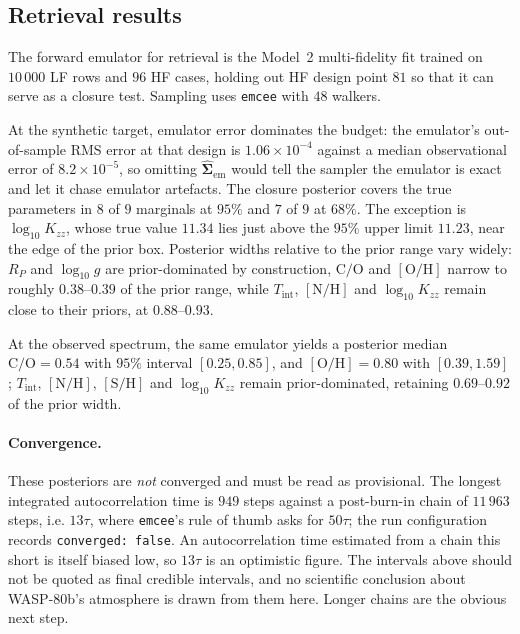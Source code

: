 \documentclass[12pt, letterpaper, oneside]{article}
\begin{document}
\subsection{Retrieval results}
\label{sec:retrieval-results}

The forward emulator for retrieval is the Model~2 multi-fidelity fit trained
on $10\,000$ LF rows and $96$ HF cases, holding out HF design point $81$ so
that it can serve as a closure test. Sampling uses \texttt{emcee} with $48$
walkers.

At the synthetic target, emulator error dominates the budget: the emulator's
out-of-sample RMS error at that design is $1.06\times10^{-4}$ against a median
observational error of $8.2\times10^{-5}$, so omitting
$\widehat{\bm\Sigma}_{\mathrm{em}}$ would tell the sampler the emulator is
exact and let it chase emulator artefacts. The closure posterior covers the
true parameters in $8$ of $9$ marginals at $95\%$ and $7$ of $9$ at $68\%$.
The exception is $\log_{10}K_{zz}$, whose true value $11.34$ lies just above
the $95\%$ upper limit $11.23$, near the edge of the prior box. Posterior
widths relative to the prior range vary widely: $R_P$ and $\log_{10}g$ are
prior-dominated by construction, $\mathrm{C/O}$ and $[\mathrm{O/H}]$ narrow to
roughly $0.38$--$0.39$ of the prior range, while $T_{\mathrm{int}}$,
$[\mathrm{N/H}]$ and $\log_{10}K_{zz}$ remain close to their priors, at
$0.88$--$0.93$.

At the observed spectrum, the same emulator yields a posterior median
$\mathrm{C/O}=0.54$ with $95\%$ interval $[0.25,0.85]$, and
$[\mathrm{O/H}]=0.80$ with $[0.39,1.59]$; $T_{\mathrm{int}}$,
$[\mathrm{N/H}]$, $[\mathrm{S/H}]$ and $\log_{10}K_{zz}$ remain
prior-dominated, retaining $0.69$--$0.92$ of the prior width.

\paragraph{Convergence.} These posteriors are \emph{not} converged and must be
read as provisional. The longest integrated autocorrelation time is $949$
steps against a post-burn-in chain of $11\,963$ steps, i.e. $13\tau$, where
\texttt{emcee}'s rule of thumb asks for $50\tau$; the run configuration records
\texttt{converged: false}. An autocorrelation time estimated from a chain this
short is itself biased low, so $13\tau$ is an optimistic figure. The intervals
above should not be quoted as final credible intervals, and no scientific
conclusion about WASP-80b's atmosphere is drawn from them here. Longer chains
are the obvious next step.
\end{document}
